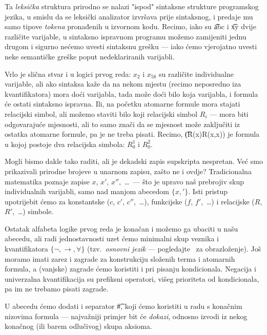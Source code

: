 Ta \emph{leksička} struktura prirodno se nalazi "ispod" sintaksne strukture programskog jezika, u smislu da se leksički analizator izvršava prije sintaksnog, i predaje mu samo tipove \emph{tokena} pronađenih u izvornom kodu. Recimo, iako su \t{abc} i \t{xy} dvije različite varijable, u sintaksno ispravnom programu možemo zamijeniti jednu drugom i sigurno nećemo uvesti sintaksnu grešku --- iako ćemo vjerojatno uvesti neke semantičke greške poput nedeklariranih varijabli.

Vrlo je slična stvar i u logici prvog reda: $x_2$ i $x_{58}$ su različite individualne varijable, ali ako sintaksa kaže da na nekom mjestu (recimo neposredno iza kvantifikatora) mora doći varijabla, tada može doći bilo koja varijabla, i formula će ostati sintaksno ispravna. Ili, na početku atomarne formule mora stajati relacijski simbol, ali možemo staviti bilo koji relacijski simbol $R_i$ --- mora biti odgovarajuće mjesnosti, ali to samo znači da se mjesnost može zaključiti iz ostatka atomarne formule, pa je ne treba pisati. Recimo, \t{(R(x)\textrightarrow R(x,x))} je formula u kojoj postoje dva relacijska simbola: $R_0^1$ i $R_0^2$.

Mogli bismo dakle tako raditi, ali je dekadski zapis supskripta nespretan. Već smo prikazivali prirodne brojeve u unarnom zapisu, zašto ne i ovdje? Tradicionalna matematika poznaje zapise $x$, $x'$, $x''$,~\ldots\ --- što je upravo naš prebrojiv skup individualnih varijabli, samo nad manjom abecedom $\{x,'\!\}$. Isti pristup upotrijebit ćemo za konstantske ($c$, $c'$, $c''$,~\ldots), funkcijske ($f$, $f'$,~\ldots) i relacijske ($R$, $R'$,~\ldots) simbole.

Ostatak alfabeta logike prvog reda je konačan i možemo ga ubaciti u našu abecedu, ali radi jednostavnosti uzet ćemo minimalni skup veznika i kvantifikatora $\{\lnot,\to,\forall\}$ (tzv\!.\ \emph{osnovni jezik} --- pogledajte~\cite[str.\ 124]{skr:VukML} za obrazloženje). Još moramo imati zarez i zagrade za konstrukciju složenih terma i atomarnih formula, a (vanjske) zagrade ćemo koristiti i pri pisanju kondicionala. Negacija i univerzalna kvantifikacija su prefiksni operatori, višeg prioriteta od kondicionala, pa im ne trebamo pisati zagrade.

U abecedu ćemo dodati i separator \t\#, koji ćemo koristiti u radu s konačnim nizovima formula --- najvažniji primjer bit će \emph{dokazi}, odnosno izvodi iz nekog konačnog (ili barem odlučivog) skupa aksioma.


